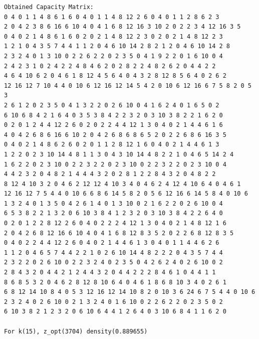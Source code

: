 \documentclass[11pt]{article}
\begin{document}
\begin{lstlisting}
Obtained Capacity Matrix:
0 4 0 1 1 4 8 6 1 6 0 4 0 1 1 4 8 12 2 6 0 4 0 1 1 2 8 6 2 3
2 0 4 2 3 8 6 16 6 10 4 0 4 1 6 8 12 16 3 10 2 0 2 2 3 4 12 16 3 5
0 4 0 2 1 4 8 6 1 6 0 2 0 2 1 4 8 12 2 3 0 2 0 2 1 4 8 12 2 3
1 2 1 0 4 3 5 7 4 4 1 1 2 0 4 6 10 14 2 8 2 1 2 0 4 6 10 14 2 8
2 3 2 4 0 1 3 10 0 2 2 6 2 2 0 2 3 5 0 4 1 9 2 2 0 1 6 10 0 4
2 4 2 3 1 0 2 4 2 2 4 8 4 6 2 0 2 8 2 2 4 8 2 6 2 0 4 4 2 2
4 6 4 10 6 2 0 4 6 1 8 12 4 5 6 4 0 4 3 2 8 12 8 5 6 4 0 2 6 2
12 16 12 7 10 4 4 0 10 6 12 16 12 14 5 4 2 0 10 6 12 16 6 7 5 8 2 0 5 3
2 6 1 2 0 2 3 5 0 4 1 3 2 2 0 2 6 10 0 4 1 6 2 4 0 1 6 5 0 2
6 10 6 8 4 2 1 6 4 0 3 5 3 8 4 2 2 3 2 0 3 10 3 8 2 2 1 6 2 0
0 2 0 1 2 4 4 12 2 6 0 2 0 2 2 4 4 12 1 3 0 4 0 2 1 4 4 6 1 6
4 0 4 2 6 8 6 16 6 10 2 0 4 2 6 8 6 8 6 5 2 0 2 2 6 8 6 16 3 5
0 4 0 2 1 4 8 6 2 6 0 2 0 1 1 2 8 12 1 6 0 4 0 2 1 4 4 6 1 3
1 2 2 0 2 3 10 14 4 8 1 1 3 0 4 3 10 14 4 8 2 2 1 0 4 6 5 14 2 4
1 6 2 2 0 2 3 10 0 2 2 3 2 2 0 2 3 10 0 2 2 3 2 2 0 2 3 10 0 4
4 4 2 3 2 0 4 8 2 1 4 4 4 3 2 0 2 8 1 2 2 8 4 3 2 0 4 8 2 2
8 12 4 10 3 2 0 4 6 2 12 12 4 10 3 4 0 4 6 2 4 12 4 10 6 4 0 4 6 1
12 16 12 7 5 4 4 0 10 6 6 8 6 14 5 8 2 0 5 6 12 16 6 14 5 8 4 0 10 6
1 3 2 4 0 1 3 5 0 4 2 6 1 4 0 1 3 10 0 2 1 6 2 2 0 2 6 10 0 4
6 5 3 8 2 2 1 3 2 0 6 10 3 8 4 1 2 3 2 0 3 10 3 8 4 2 2 6 4 0
0 2 0 1 2 2 8 12 2 6 0 4 0 2 2 2 4 12 1 3 0 4 0 2 1 4 8 12 1 6
2 0 4 2 6 8 12 16 6 10 4 0 4 1 6 8 12 8 3 5 2 0 2 2 6 8 12 8 3 5
0 4 0 2 2 4 4 12 2 6 0 4 0 2 1 4 4 6 1 3 0 4 0 1 1 4 4 6 2 6
1 1 2 0 4 6 5 7 4 4 2 2 1 0 2 6 10 14 4 8 2 2 2 0 4 3 5 7 4 4
2 3 2 2 0 2 6 10 0 2 2 3 2 4 0 2 3 5 0 4 2 6 2 4 0 2 6 10 0 2
2 8 4 3 2 0 4 4 2 1 2 4 4 3 2 0 4 4 2 2 2 8 4 6 1 0 4 4 1 1
8 6 8 5 3 2 0 4 6 2 8 12 8 10 6 4 0 4 6 1 8 6 8 10 3 4 0 2 6 1
6 8 12 14 10 8 4 0 5 3 12 16 12 14 10 8 2 0 10 3 6 24 6 7 5 4 4 0 10 6
2 3 2 4 0 2 6 10 0 2 1 3 2 4 0 1 6 10 0 2 2 6 2 2 0 2 3 5 0 2
6 10 3 8 2 1 2 3 2 0 6 10 6 4 4 1 2 6 4 0 3 10 6 8 4 1 1 6 2 0

For k(15), z_opt(3704) density(0.889655)

\end{lstlisting}
\end{document}
